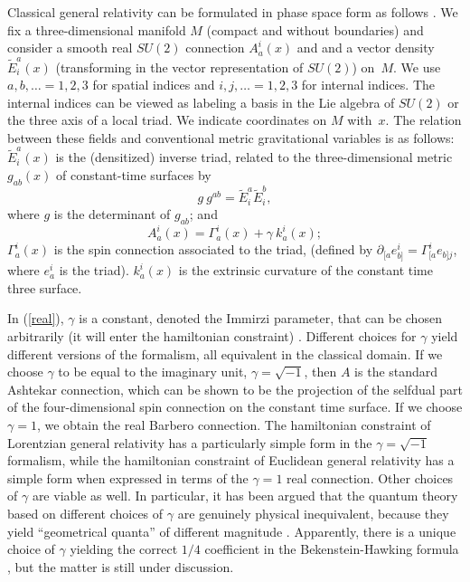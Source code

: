 \documentclass[12pt]{article}
\begin{document}
Classical general relativity can be formulated in phase space 
form as follows \cite{AshtekarBook,Barbero3}.  We fix a 
three-dimensional manifold $M$ (compact and without boundaries) 
and consider a smooth real $SU(2)$ connection $A_a^i(x)$ and and 
a vector density $\tilde{E}^a_i(x)$ (transforming in the vector 
representation of $SU(2)$) on~$M$.  We use $a,b,\ldots=1,2,3$ for 
spatial indices and $i,j,\ldots=1,2,3$ for internal indices.  The 
internal indices can be viewed as labeling a basis in the Lie 
algebra of $SU(2)$ or the three axis of a local triad.  We 
indicate coordinates on $M$ with~$x$.  The relation between these 
fields and conventional metric gravitational variables is as 
follows: $\tilde{E}^a_i(x)$ is the (densitized) inverse triad, 
related to the three-dimensional metric $g_{ab}(x)$ of 
constant-time surfaces by 
%
 \begin{equation} 
 g\ g^{ab} = \tilde{E}^a_i\tilde{E}^b_i, 
 \end{equation} 
% 
 where $g$ is the determinant of $g_{ab}$; and 
% 
\begin{equation} 
A_a^i(x)=\Gamma_a^i(x)+ \gamma\ k_a^i(x); 
\label{real} 
\end{equation} 
$\Gamma_a^i(x)$ is the spin connection associated to the triad, 
(defined by $\partial_{[a}e_{b]}^{i}=\Gamma_{[a}^i e_{b]j}$, where 
$e_{a}^{i}$ is the triad).  $k_a^i(x)$ is the extrinsic curvature 
of the constant time three surface.  

In (\ref{real}), $\gamma$ is a constant, denoted the Immirzi 
parameter, that can be chosen arbitrarily (it will enter the 
hamiltonian constraint) \cite{Immirzi2,Immirzi3,Immirzi}.  
Different choices for $\gamma$ yield different versions of the 
formalism, all equivalent in the classical domain.  If we choose 
$\gamma$ to be equal to the imaginary unit, $\gamma=\sqrt{-1}$, 
then $A$ is the standard Ashtekar connection, which can be shown  
to be the projection of the selfdual part of the four-dimensional 
spin connection on the constant time surface.  If we choose 
$\gamma=1$, we obtain the real Barbero connection.  The 
hamiltonian constraint of Lorentzian general relativity has a 
particularly simple form in the $\gamma=\sqrt{-1}$ formalism, 
while the hamiltonian constraint of Euclidean general relativity 
has a simple form when expressed in terms of the $\gamma=1$ real 
connection.  Other choices of $\gamma$ are viable as well.  In 
particular, it has been argued that the quantum theory based on 
different choices of $\gamma$ are genuinely physical 
inequivalent, because they yield ``geometrical quanta'' of 
different magnitude \cite{RovelliThiemann}.  Apparently, there is 
a unique choice of $\gamma$ yielding the correct $1/4$ 
coefficient in the Bekenstein-Hawking formula 
\cite{Krasnov,Krasnov2,Rovelli96,AshtekarEtAl97,%
RovelliAscona,CorichiKrasnov}, 
but the matter is still under discussion.
\end{document}
